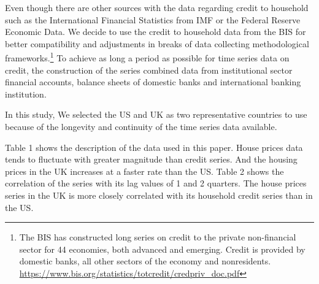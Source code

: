 \documentclass[
  12pt,
]{article}
\begin{document}
Even though there are other sources with the data regarding credit to household such as the International Financial Statistics from IMF or the Federal Reserve Economic Data. We decide to use the credit to household data from the BIS for better compatibility and adjustments in breaks of data collecting methodological frameworks.\footnote{The BIS has constructed long series on credit to the private non-financial sector for 44 economies, both advanced and emerging. Credit is provided by domestic banks, all other sectors of the economy and nonresidents. \url{https://www.bis.org/statistics/totcredit/credpriv_doc.pdf}} To achieve as long a period as possible for time series data on credit, the construction of the series combined data from institutional sector financial accounts, balance sheets of domestic banks and international banking institution.

In this study, We selected the US and UK as two representative countries to use because of the longevity and continuity of the time series data available.

Table 1 shows the description of the data used in this paper. House prices data tends to fluctuate with greater magnitude than credit series. And the housing prices in the UK increases at a faster rate than the US. Table 2 shows the correlation of the series with its lag values of 1 and 2 quarters. The house prices series in the UK is more closely correlated with its household credit series than in the US.
\end{document}
